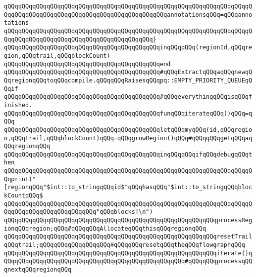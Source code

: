 \verb|qQQqqQQqqQQqqQQqqQQqqQQqqQQqqQQqqQQqqQQqqQQqqQQqqQQqqQQqqQQqqQQqqQQqqQQqqQQqqQQqqQQqqQQqqQQqqQQqqQQqqQQqqQQqqQQqqQQqannotationsqQQq=qQQqannotations|\newline
\verb|qQQqqQQqqQQqqQQqqQQqqQQqqQQqqQQqqQQqqQQqqQQqqQQqqQQqqQQqqQQqqQQqqQQqqQQqqQQqqQQqqQQqqQQqqQQqqQQqqQQqqQQqqQQqqQQq}|\newline
\verb|qQQqqQQqqQQqqQQqqQQqqQQqqQQqqQQqqQQqqQQqqQQqinqQQqqQQq(regionId,qQQqregion,qQQqtrail,qQQqblockCount)|\newline
\verb|qQQqqQQqqQQqqQQqqQQqqQQqqQQqqQQqqQQqqQQqqQQqend|\newline
\newline
\newline
\verb|qQQqqQQqqQQqqQQqqQQqqQQqqQQqqQQqqQQqqQQqqQQq#qQQqExtractqQQqaqQQqnewqQQqregionqQQqtoqQQqcompile.qQQqqQQqRaisesqQQqpq::EMPTY_PRIORITY_QUEUEqQQqif|\newline
\verb|qQQqqQQqqQQqqQQqqQQqqQQqqQQqqQQqqQQqqQQqqQQq#qQQqeverythingqQQqisqQQqfinished.|\newline
\newline
\verb|qQQqqQQqqQQqqQQqqQQqqQQqqQQqqQQqqQQqqQQqqQQqfunqQQqiterateqQQq()qQQq=qQQq|\newline
\verb|qQQqqQQqqQQqqQQqqQQqqQQqqQQqqQQqqQQqqQQqqQQqletqQQqmyqQQq(id,qQQqregion,qQQqtrail,qQQqblockCount)qQQq=qQQqgrowRegion()qQQq#qQQqqQQqgetqQQqaqQQqregionqQQq|\newline
\verb|qQQqqQQqqQQqqQQqqQQqqQQqqQQqqQQqqQQqqQQqqQQqinqQQqqQQqifqQQqdebugqQQqthen|\newline
\verb|qQQqqQQqqQQqqQQqqQQqqQQqqQQqqQQqqQQqqQQqqQQqqQQqqQQqqQQqqQQqqQQqqQQqqQQqprint("[regionqQQq"$int::to_stringqQQqid$"qQQqhasqQQq"$int::to_stringqQQqblockCountqQQq$|\newline
\verb|qQQqqQQqqQQqqQQqqQQqqQQqqQQqqQQqqQQqqQQqqQQqqQQqqQQqqQQqqQQqqQQqqQQqqQQqqQQqqQQqqQQqqQQqqQQqqQQq"qQQqblocks]\n")|\newline
\newline
\verb|qQQqqQQqqQQqqQQqqQQqqQQqqQQqqQQqqQQqqQQqqQQqqQQqqQQqqQQqqQQqprocessRegionqQQqregion;qQQq#qQQqqQQqAllocateqQQqthisqQQqregionqQQq|\newline
\verb|qQQqqQQqqQQqqQQqqQQqqQQqqQQqqQQqqQQqqQQqqQQqqQQqqQQqqQQqqQQqresetTrailqQQqtrail;qQQqqQQqqQQqqQQqqQQq#qQQqqQQqresetqQQqtheqQQqflowgraphqQQq|\newline
\verb|qQQqqQQqqQQqqQQqqQQqqQQqqQQqqQQqqQQqqQQqqQQqqQQqqQQqqQQqqQQqiterate()qQQqqQQqqQQqqQQqqQQqqQQqqQQqqQQqqQQqqQQqqQQqqQQqqQQq#qQQqqQQqprocessqQQqnextqQQqregionqQQq|\newline
